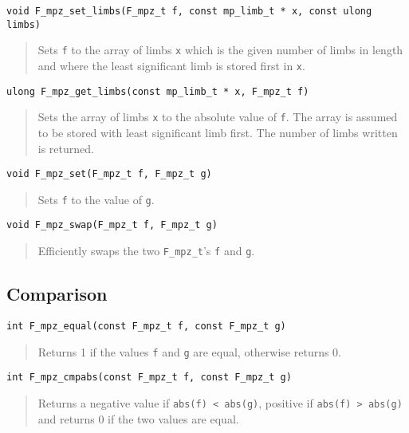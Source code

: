 \documentclass[a4paper,10pt]{article}
\newcommand{\code}{\lstinline}
\begin{document}
\begin{lstlisting}
void F_mpz_set_limbs(F_mpz_t f, const mp_limb_t * x, const ulong limbs)
\end{lstlisting}
\begin{quote}
Sets \code{f} to the array of limbs \code{x} which is the given number of limbs in length and where the least significant limb is stored first in \code{x}.
\end{quote}

\begin{lstlisting}
ulong F_mpz_get_limbs(const mp_limb_t * x, F_mpz_t f)
\end{lstlisting}
\begin{quote}
Sets the array of limbs \code{x} to the absolute value of \code{f}. The array is assumed to be stored with least significant limb first. The number of limbs written is returned.
\end{quote}

\begin{lstlisting}
void F_mpz_set(F_mpz_t f, F_mpz_t g)
\end{lstlisting}
\begin{quote}
Sets \code{f} to the value of \code{g}.
\end{quote}

\begin{lstlisting}
void F_mpz_swap(F_mpz_t f, F_mpz_t g)
\end{lstlisting}
\begin{quote}
Efficiently swaps the two \code{F_mpz_t}'s \code{f} and \code{g}. 
\end{quote}

\subsection{Comparison}

\begin{lstlisting}
int F_mpz_equal(const F_mpz_t f, const F_mpz_t g)
\end{lstlisting}
\begin{quote}
Returns 1 if the values \code{f} and \code{g} are equal, otherwise returns 0.
\end{quote}

\begin{lstlisting}
int F_mpz_cmpabs(const F_mpz_t f, const F_mpz_t g)
\end{lstlisting}
\begin{quote}
Returns a negative value if \code{abs(f) < abs(g)}, positive if \code{abs(f) > abs(g)} and returns 0 if the two values are equal.
\end{quote}
\end{document}
